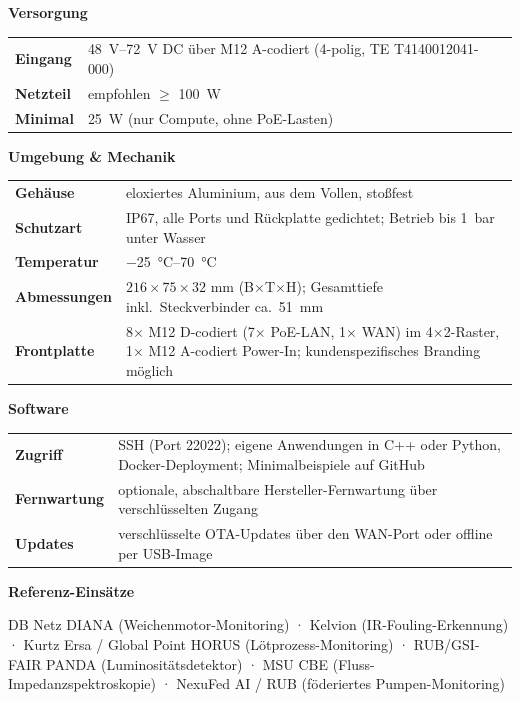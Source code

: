 \documentclass[10pt,a4paper]{article}
\begin{document}
\begin{minipage}[t]{0.48\textwidth}
\textbf{Versorgung}\par\vspace{1mm}
\begin{tabularx}{\textwidth}{@{}>{\bfseries}p{2.9cm}X@{}}
\toprule
Eingang & \SIrange{48}{72}{V} DC über M12 A-codiert (4-polig, TE T4140012041-000) \\
Netzteil & empfohlen $\geq$ \SI{100}{W} \\
Minimal & \SI{25}{W} (nur Compute, ohne PoE-Lasten) \\
\bottomrule
\end{tabularx}

\vspace{2mm}
\textbf{Umgebung \& Mechanik}\par\vspace{1mm}
\begin{tabularx}{\textwidth}{@{}>{\bfseries}p{2.9cm}X@{}}
\toprule
Gehäuse & eloxiertes Aluminium, aus dem Vollen, stoßfest \\
Schutzart & IP67, alle Ports und Rückplatte gedichtet; Betrieb bis \SI{1}{bar} unter Wasser \\
Temperatur & \SIrange{-25}{70}{\celsius} \\
Abmessungen & $216 \times 75 \times 32$ \si{mm} (B$\times$T$\times$H); Gesamttiefe inkl.\ Steckverbinder ca.\ \SI{51}{mm} \\
Frontplatte & 8$\times$ M12 D-codiert (7$\times$ PoE-LAN, 1$\times$ WAN) im 4$\times$2-Raster, 1$\times$ M12 A-codiert Power-In; kundenspezifisches Branding möglich \\
\bottomrule
\end{tabularx}

\vspace{2mm}
\textbf{Software}\par\vspace{1mm}
\begin{tabularx}{\textwidth}{@{}>{\bfseries}p{2.9cm}X@{}}
\toprule
Zugriff & SSH (Port 22022); eigene Anwendungen in C++ oder Python, Docker-Deployment; Minimalbeispiele auf GitHub \\
Fernwartung & optionale, abschaltbare Hersteller-Fernwartung über verschlüsselten Zugang \\
Updates & verschlüsselte OTA-Updates über den WAN-Port oder offline per USB-Image \\
\bottomrule
\end{tabularx}

\vspace{2mm}
\textbf{Referenz-Einsätze}\par\vspace{1mm}
{\small DB Netz DIANA (Weichenmotor-Monitoring) · Kelvion (IR-Fouling-Erkennung) · Kurtz Ersa / Global Point HORUS (Lötprozess-Monitoring) · RUB/GSI-FAIR PANDA (Luminositätsdetektor) · MSU CBE (Fluss-Impedanzspektroskopie) · NexuFed AI / RUB (föderiertes Pumpen-Monitoring)}
\end{minipage}
\end{document}
